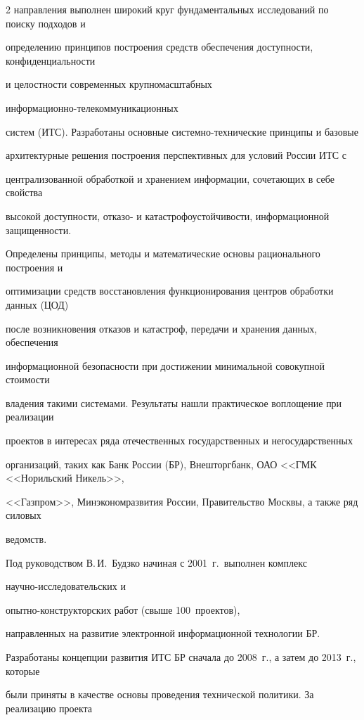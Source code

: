 \begin{multicols}{2}
направления выполнен широкий круг фундаментальных исследований по поиску подходов и

определению принципов построения средств обеспечения доступности, конфиденциальности

и целостности современных крупномасштабных

ин\-фор\-ма\-ци\-он\-но-те\-ле\-ком\-му\-ни\-ка\-ци\-он\-ных

сис\-тем (ИТС). Разработаны основные сис\-тем\-но-тех\-ни\-че\-ские принципы и базовые

архитектурные решения построения перспективных для условий России ИТС с

централизованной обработкой и хранением информации, сочетающих в себе свойства

высокой доступности, отказо- и катастрофоустойчивости, информационной защищенности.

Определены принципы, методы и математические основы рационального построения и

оптимизации средств восстановления функционирования центров обработки данных (ЦОД)

после возникновения отказов и катастроф, передачи и хранения данных, обеспечения

информационной безопасности при достижении минимальной совокупной стоимости

владения такими системами. Результаты нашли практическое воплощение при реализации

проектов в интересах ряда отечественных государственных и негосударственных

организаций, таких как Банк России (БР), Внешторгбанк, ОАО <<ГМК <<Норильский Никель>>,

<<Газпром>>, Минэкономразвития России, Правительство Москвы, а также ряд силовых

ведомств.



      Под руководством В.\,И.~Будзко начиная с 2001~г.\ выполнен комплекс

      на\-уч\-но-ис\-сле\-до\-ва\-тель\-ских и

      опыт\-но-кон\-ст\-рук\-тор\-ских работ (свыше 100~проектов),

направленных на развитие электронной информационной технологии БР.

Разработаны концепции развития ИТС БР сначала до 2008~г., а затем до 2013~г., которые

были приняты в качестве основы проведения технической политики. За реализацию проекта


\end{multicols}

